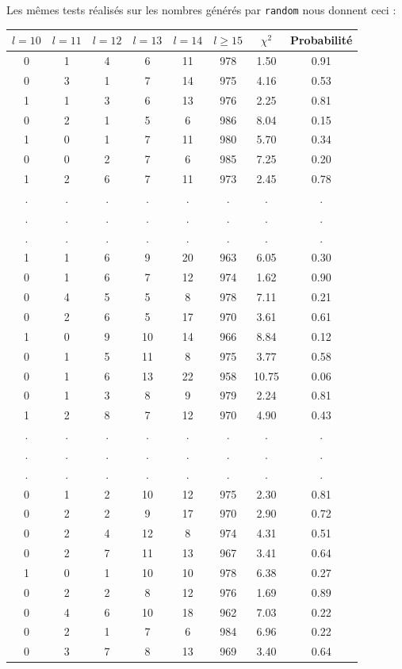 \documentclass[12pt,a4paper]{article}
\begin{document}
\newpage
Les mêmes tests réalisés sur les nombres générés par \texttt{random}
nous donnent ceci :


\begin{center}
\begin{tabular}{|c|c|c|c|c|c|c|c|}
\hline
$l = 10$ & $l = 11$ & $l = 12$ & $l = 13$ & $l = 14$ & $l \geq 15$ & $\chi^2$ & Probabilité \\ \hline
0 & 1 & 4 & 6 & 11 & 978 &  1.50 &  0.91\\ \hline
0 & 3 & 1 & 7 & 14 & 975 &  4.16 &  0.53\\ \hline
1 & 1 & 3 & 6 & 13 & 976 &  2.25 &  0.81\\ \hline
0 & 2 & 1 & 5 & 6 & 986 &  8.04 &  0.15\\ \hline
1 & 0 & 1 & 7 & 11 & 980 &  5.70 &  0.34\\ \hline
0 & 0 & 2 & 7 & 6 & 985 &  7.25 &  0.20\\ \hline
1 & 2 & 6 & 7 & 11 & 973 &  2.45 &  0.78\\ \hline
 . & . & . & . & . & . & . & .\\ \hline
 . & . & . & . & . & . & . & .\\ \hline
 . & . & . & . & . & . & . & .\\ \hline

1 & 1 & 6 & 9 & 20 & 963 &  6.05 &  0.30\\ \hline
0 & 1 & 6 & 7 & 12 & 974 &  1.62 &  0.90\\ \hline
0 & 4 & 5 & 5 & 8 & 978 &  7.11 &  0.21\\ \hline
0 & 2 & 6 & 5 & 17 & 970 &  3.61 &  0.61\\ \hline
1 & 0 & 9 & 10 & 14 & 966 &  8.84 &  0.12\\ \hline
0 & 1 & 5 & 11 & 8 & 975 &  3.77 &  0.58\\ \hline
0 & 1 & 6 & 13 & 22 & 958 & 10.75 &  0.06\\ \hline
0 & 1 & 3 & 8 & 9 & 979 &  2.24 &  0.81\\ \hline
1 & 2 & 8 & 7 & 12 & 970 &  4.90 &  0.43\\ \hline
 . & . & . & . & . & . & . & .\\ \hline
 . & . & . & . & . & . & . & .\\ \hline
 . & . & . & . & . & . & . & .\\ \hline
0 & 1 & 2 & 10 & 12 & 975 &  2.30 &  0.81\\ \hline
0 & 2 & 2 & 9 & 17 & 970 &  2.90 &  0.72\\ \hline
0 & 2 & 4 & 12 & 8 & 974 &  4.31 &  0.51\\ \hline
0 & 2 & 7 & 11 & 13 & 967 &  3.41 &  0.64\\ \hline
1 & 0 & 1 & 10 & 10 & 978 &  6.38 &  0.27\\ \hline
0 & 2 & 2 & 8 & 12 & 976 &  1.69 &  0.89\\ \hline
0 & 4 & 6 & 10 & 18 & 962 &  7.03 &  0.22\\ \hline
0 & 2 & 1 & 7 & 6 & 984 &  6.96 &  0.22\\ \hline
0 & 3 & 7 & 8 & 13 & 969 &  3.40 &  0.64\\ \hline
\end{tabular}
\end{center}
\end{document}
